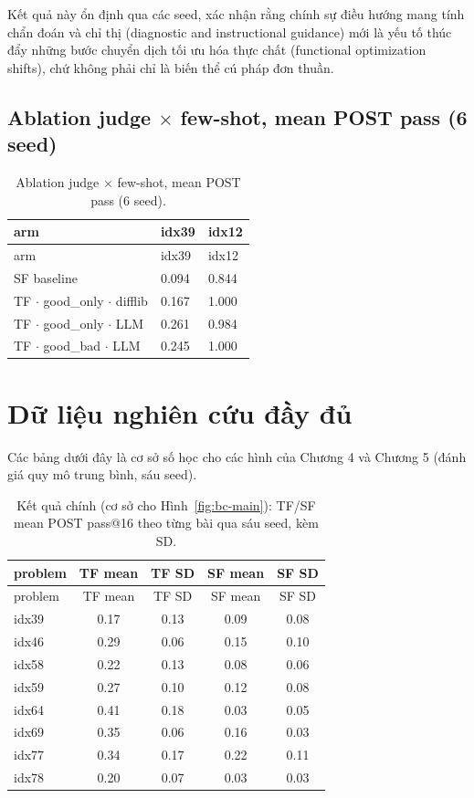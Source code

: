 Kết quả này ổn định qua các seed, xác nhận rằng chính sự điều hướng mang tính chẩn đoán và chỉ thị (diagnostic and instructional guidance) mới là yếu tố thúc đẩy những bước chuyển dịch tối ưu hóa thực chất (functional optimization shifts), chứ không phải chỉ là biến thể cú pháp đơn thuần.

\section{Ablation judge $\times$ few-shot, mean POST pass (6 seed)}\label{e.5-judge-few-shot-ablation-mean-post-pass-6-seeds}

\begin{longtable}{lll}
\caption{Ablation judge $\times$ few-shot, mean POST pass (6 seed).}\\
\toprule
arm & idx39 & idx12 \\
\midrule
\endfirsthead
\toprule
arm & idx39 & idx12 \\
\midrule
\endhead
\bottomrule
\endfoot
SF baseline & 0.094 & 0.844 \\
TF $\cdot$ good\_only $\cdot$ difflib & 0.167 & 1.000 \\
TF $\cdot$ good\_only $\cdot$ LLM & 0.261 & 0.984 \\
TF $\cdot$ good\_bad $\cdot$ LLM & 0.245 & 1.000 \\
\end{longtable}

\chapter{Dữ liệu nghiên cứu đầy đủ}\label{appendix-g-full-study-data}

Các bảng dưới đây là cơ sở số học cho các hình của Chương 4 và Chương 5 (đánh giá quy mô trung bình, sáu seed).

\begin{longtable}{lcccc}
\caption{Kết quả chính (cơ sở cho Hình~\ref{fig:bc-main}): TF/SF mean POST pass@16 theo từng bài qua sáu seed, kèm SD.}\\
\toprule
problem & TF mean & TF SD & SF mean & SF SD \\
\midrule
\endfirsthead
\toprule
problem & TF mean & TF SD & SF mean & SF SD \\
\midrule
\endhead
\bottomrule
\endfoot
idx39 & 0.17 & 0.13 & 0.09 & 0.08 \\
idx46 & 0.29 & 0.06 & 0.15 & 0.10 \\
idx58 & 0.22 & 0.13 & 0.08 & 0.06 \\
idx59 & 0.27 & 0.10 & 0.12 & 0.08 \\
idx64 & 0.41 & 0.18 & 0.03 & 0.05 \\
idx69 & 0.35 & 0.06 & 0.16 & 0.03 \\
idx77 & 0.34 & 0.17 & 0.22 & 0.11 \\
idx78 & 0.20 & 0.07 & 0.03 & 0.03 \\
\end{longtable}

